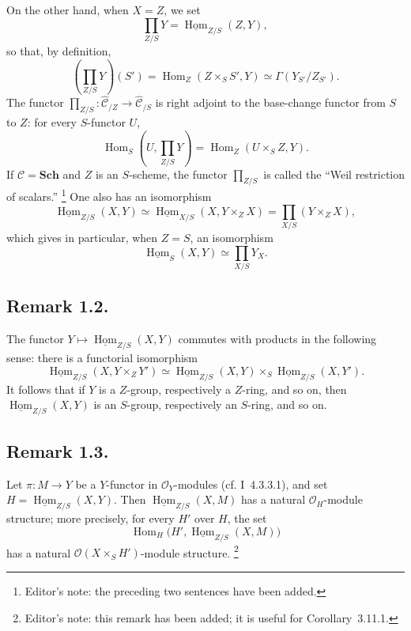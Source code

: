 On the other hand, when \(X=Z\), we set
\begin{equation}
  \prod_{Z/S}Y
  =\underline{\operatorname{Hom}}_{Z/S}(Z,Y),
  \tag{5}
\end{equation}
so that, by definition,
\[
  \left(\prod_{Z/S}Y\right)(S')
  =\operatorname{Hom}_Z(Z\times_SS',Y)
  \simeq \Gamma(Y_{S'}/Z_{S'}).
\]
The functor
\(\prod_{Z/S}:\widehat{\mathscr C}_{/Z}\to
\widehat{\mathscr C}_{/S}\) is right adjoint to the base-change functor
from \(S\) to \(Z\): for every \(S\)-functor \(U\),
\[
  \operatorname{Hom}_S\left(U,\prod_{Z/S}Y\right)
  =\operatorname{Hom}_Z(U\times_SZ,Y).
\]
If \(\mathscr C=\mathbf{Sch}\) and \(Z\) is an \(S\)-scheme, the functor
\(\prod_{Z/S}\) is called the ``Weil restriction of scalars.''
\footnote{Editor's note: the preceding two sentences have been added.}
One also has an isomorphism
\begin{equation}
  \underline{\operatorname{Hom}}_{Z/S}(X,Y)
  \simeq
  \underline{\operatorname{Hom}}_{X/S}(X,Y\times_ZX)
  =\prod_{X/S}(Y\times_ZX),
  \tag{6}
\end{equation}
which gives in particular, when \(Z=S\), an isomorphism
\begin{equation}
  \underline{\operatorname{Hom}}_S(X,Y)
  \simeq \prod_{X/S}Y_X.
  \tag{7}
\end{equation}

\subsection*{Remark 1.2.}
The functor
\(Y\mapsto\underline{\operatorname{Hom}}_{Z/S}(X,Y)\) commutes with
products in the following sense: there is a functorial isomorphism
\[
  \underline{\operatorname{Hom}}_{Z/S}(X,Y\times_ZY')
  \simeq
  \underline{\operatorname{Hom}}_{Z/S}(X,Y)
  \times_S
  \underline{\operatorname{Hom}}_{Z/S}(X,Y').
  \tag{*}
\]
It follows that if \(Y\) is a \(Z\)-group, respectively a \(Z\)-ring,
and so on, then \(\underline{\operatorname{Hom}}_{Z/S}(X,Y)\) is an
\(S\)-group, respectively an \(S\)-ring, and so on.

\subsection*{Remark 1.3.}
Let \(\pi:M\to Y\) be a \(Y\)-functor in \(\mathcal O_Y\)-modules
(cf. I~4.3.3.1), and set
\(H=\underline{\operatorname{Hom}}_{Z/S}(X,Y)\). Then
\(\underline{\operatorname{Hom}}_{Z/S}(X,M)\) has a natural
\(\mathcal O_H\)-module structure; more precisely, for every \(H'\) over
\(H\), the set
\[
  \operatorname{Hom}_H
    \bigl(H',\underline{\operatorname{Hom}}_{Z/S}(X,M)\bigr)
\]
has a natural \(\mathcal O(X\times_SH')\)-module structure.
\footnote{Editor's note: this remark has been added; it is useful for
Corollary~3.11.1.}


